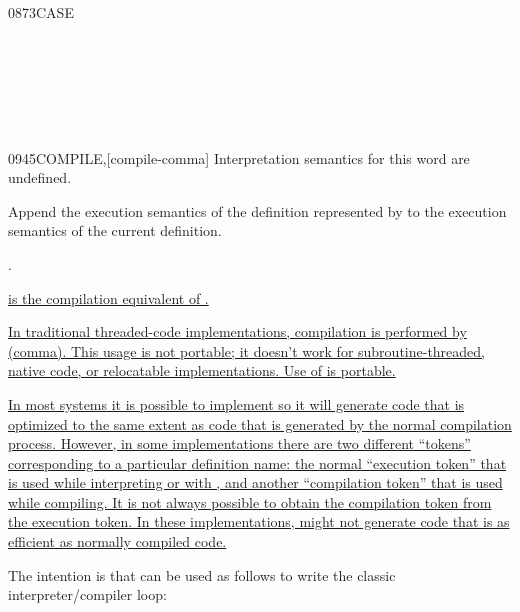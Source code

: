 \begin{worddef}{0873}{CASE}
\begin{testing}
		 \\
		 \\
		 \\
		 \\
		 \\
	\end{testing}
\end{worddef}


\begin{worddef}{0945}{COMPILE,}[compile-comma]
\interpret
	Interpretation semantics for this word are undefined.

\execute

	Append the execution semantics of the definition represented
	by  to the execution semantics of the current
	definition.

\see {}.

	\begin{rationale} %
\cbstart{}
		\uline{ is the compilation equivalent of
		.}

\uline{%
		In traditional threaded-code implementations, compilation is
		performed by \word{,} (comma). This usage is not portable; it
		doesn't work for subroutine-threaded, native code, or
		relocatable implementations. Use of  is portable.
}

\uline{%
		In most systems it is possible to implement  so
		it will generate code that is optimized to the same extent as
		code that is generated by the normal compilation process.
		However, in some implementations there are two different
		``tokens'' corresponding to a particular definition name:
		the normal ``execution token'' that is used while interpreting
		or with , and another ``compilation token'' that
		is used while compiling. It is not always possible to obtain
		the compilation token from the execution token. In these
		implementations,  might not generate code that
		is as efficient as normally compiled code.
}

		The intention is that  can be used as follows to write
		the classic interpreter/com\-piler loop:


\end{rationale}
\end{worddef}
